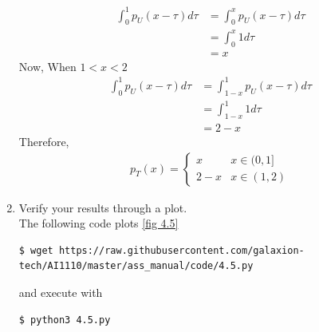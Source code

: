 \documentclass[journal,12pt,twocolumn]{IEEEtran}
\renewcommand\thesection{\arabic{section}}
\begin{document}
\begin{enumerate}[label=\thesection.\arabic*.,ref=\thesection.\theenumi]
\begin{align}
        \int_{0}^{1} p_U(x-\tau)d\tau &= \int_{0}^{x}p_U(x-\tau)d\tau \\
        &= \int_{0}^{x}1d\tau \\
        &= x
    \end{align}
    Now, When $1<x<2$ \\
    \begin{align}
        \int_{0}^{1} p_U(x-\tau)d\tau &= \int_{1-x}^{1}p_U(x-\tau)d\tau \\
        &= \int_{1-x}^{1}1d\tau \\
        &= 2-x
    \end{align}
    Therefore,
    \begin{align}
        p_T(x)=\begin{cases}
            x & x \in (0,1] \\
            2-x & x \in (1,2)
        \end{cases}
    \end{align}
    

    \item Verify your results through a plot. \\
    \solution 
    The following code plots \ref{fig 4.5}
    \begin{lstlisting}
$ wget https://raw.githubusercontent.com/galaxion-tech/AI1110/master/ass_manual/code/4.5.py
    \end{lstlisting}
    and execute with
    \begin{lstlisting}
$ python3 4.5.py
    \end{lstlisting}


\end{enumerate}
\end{document}
